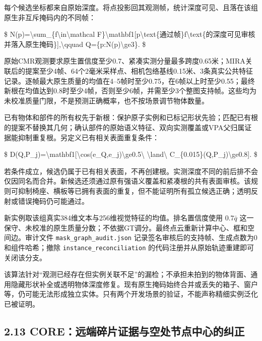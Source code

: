 \documentclass[UTF8,fontset=fandol]{ctexart}
\begin{document}
每个候选坐标都来自原始深度。将点投影回其观测帧，统计深度可见、且落在该组原生非互斥掩码内的不同帧：



\$
N(p)=\textbackslash{}sum\_\{f\textbackslash{}in\textbackslash{}mathcal F\}\textbackslash{}mathbf1[p\textbackslash{}text\{通过帧\}f\textbackslash{}text\{的深度可见审核并落入原生掩码\}],\textbackslash{}qquad Q=\{p:N(p)\textbackslash{}ge3\}.
\$



原始CMR观测要求原生置信度至少0.7、紧凑实测分量最多跨度0.65米；MIRA关联后的提案至少4帧、64个2毫米采样点、相机包络基线0.15米、3条真实公共特征记录。逐帧最大原生质量的均值在4–5帧时至少0.75，在6帧以上时至少0.55；最终新根在均值达到0.8时至少4帧，否则至少6帧，并需至少3个整图支持帧。这些均为未校准质量门限，不是预测正确概率，也不按场景调节物体数量。



已有物体和部件的所有权先于新根：保护原子实例和已标记形状先验；匹配已有根的提案不替换其几何；确认部件的原始语义特征、双向实测覆盖或VPA父归属证据能抑制重复根。另定义已有相关表面重复条件：



\$
D(Q,P\_j)=\textbackslash{}mathbf1[\textbackslash{}cos(e\_Q,e\_j)\textbackslash{}ge0.5\textbackslash{} \textbackslash{}land\textbackslash{} C\_\{0.015\}(Q,P\_j)\textbackslash{}ge0.8].
\$



若条件成立，候选仍属于已有相关表面，不再创建根。实测深度不同的前后排不会仅因同名而合并。新候选还须通过原有强语义覆盖和紧凑根的共有表面审核。该规则可抑制椅座、横板等已拥有表面的重复，但不能证明所有孤立候选正确；透明反射或错误掩码仍可能通过。



新实例取该组真实384维文本与256维视觉特征的均值。排名置信度使用 $0.7\bar q$ 这一保守、未校准的原生质量分数；不依据GT调分。最终点云重新计算中心、框和空间边。审计文件 \texttt{mask\_\allowbreak{}graph\_\allowbreak{}audit.\allowbreak{}json} 记录签名审核后的支持帧、生成点数为0和组件哈希；撤除 \texttt{instance\_\allowbreak{}reconciliation} 的代码注册并从原始轨迹重建即可关闭该分支。



该算法针对“观测已经存在但实例关联不足”的漏检；不承担未拍到的物体背面、通用隐藏形状补全或透明物体深度修复。现有原生掩码始终合并或丢失的箱子、窗户等，仍可能无法形成独立实体。只有两个开发场景的验证，不能声称精细实例泛化已被证明。



\subsection*{2.13 CORE：远端碎片证据与空处节点中心的纠正}
\end{document}
